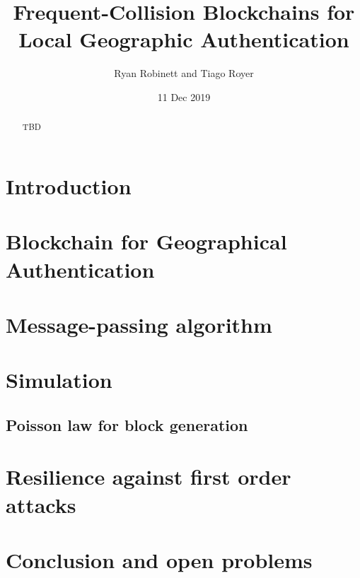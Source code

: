 \documentclass{article}
\begin{document}
\title{Frequent-Collision Blockchains for Local Geographic Authentication}
\author{Ryan Robinett and Tiago Royer}
\date{11 Dec 2019}
\maketitle


\begin{abstract}
	TBD
\end{abstract}

\section{Introduction}

\section{Blockchain for Geographical Authentication}

\section{Message-passing algorithm}

\section{Simulation}
\subsection{Poisson law for block generation}


\section{Resilience against first order attacks}

\section{Conclusion and open problems}



\end{document}
